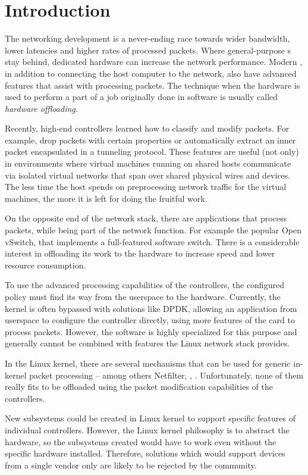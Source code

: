 \chapter{Introduction}

The networking development is a never-ending race towards wider bandwidth,
lower latencies and higher rates of processed packets. Where general-purpose
s stay behind, dedicated hardware can increase the network performance.
Modern , in addition to connecting the host
computer to the network, also have advanced features that assist with
processing packets. The technique when the hardware is used to perform a part of
a job originally done in software is usually called \emph{hardware offloading}.

Recently, high-end controllers learned how to classify and modify packets. For
example, drop packets with certain properties or automatically extract an inner
packet encapsulated in a tunneling protocol. These features are useful (not
only) in environments where virtual machines running on shared hosts communicate via isolated
virtual networks that span over shared physical wires and devices. The less time the
host spends on preprocessing network traffic for the virtual machines, the more
it is left for doing the fruitful work.

On the opposite end of the network stack, there are applications that process
packets, while being part of the network function. For example the popular
Open vSwitch, that implements a full-featured software switch. There is
a considerable interest in offloading its work to the hardware to increase
speed and lower resource consumption.

To use the advanced processing capabilities of the controllers, the configured
policy must find its way from the userspace to the hardware. Currently, the
kernel is often bypassed with solutions like \acrfull{DPDK}, allowing an
application from userspace to configure the controller directly, using more
features of the card to process packets. However, the software is
highly specialized for this purpose and generally cannot be combined with
features the Linux network stack provides.

In the Linux kernel, there are several mechanisms that can be used for generic
in-kernel packet processing -- among others Netfilter, , .
Unfortunately, none of them really fits to be offloaded using the packet
modification capabilities of the controllers.

New subsystems could be created in Linux kernel to support specific features of
individual controllers. However, the Linux kernel philosophy is to abstract the
hardware, so the subsystems created would have to work even without the
specific hardware installed. Therefore, solutions which would support devices
from a single vendor only are likely to be rejected by the community.

